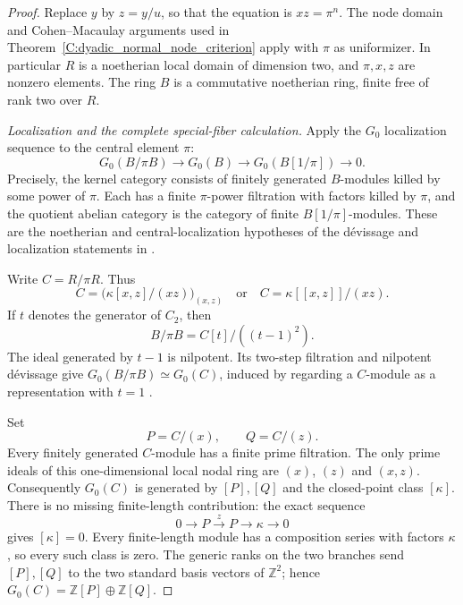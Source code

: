 \begin{proof}
Replace $y$ by $z=y/u$, so that the equation is
$xz=\pi^n$.  The node domain and Cohen--Macaulay
arguments used in Theorem~\ref{C:dyadic_normal_node_criterion}
apply with $\pi$ as uniformizer.
In particular $R$ is a noetherian local domain of
dimension two, and $\pi,x,z$ are nonzero elements.
The ring $B$ is a commutative noetherian ring, finite
free of rank two over $R$.

\emph{Localization and the complete special-fiber calculation.}
Apply the $G_0$ localization sequence to the central
element $\pi$:
\[
 G_0(B/\pi B)\longrightarrow G_0(B)
       \longrightarrow G_0(B[1/\pi])\longrightarrow0. \tag{C.1.MB2}
\]
Precisely, the kernel category consists of finitely
generated $B$-modules killed by some power of $\pi$.
Each has a finite $\pi$-power filtration with factors
killed by $\pi$, and the quotient abelian category
is the category of finite $B[1/\pi]$-modules.
These are the noetherian and central-localization
hypotheses of the d\'evissage and localization statements
in \cite[II.6.3, II.6.3.3 and II.6.4.1]
{C-WeibelKbook2013}.

Write $C=R/\pi R$.  Thus
\[
 C=\bigl(\kappa[x,z]/(xz)\bigr)_{(x,z)}
 \quad\text{or}\quad C=\kappa[[x,z]]/(xz).
\]
If $t$ denotes the generator of $C_2$, then
\[
 B/\pi B=C[t]/((t-1)^2).
\]
The ideal generated by $t-1$ is nilpotent.
Its two-step filtration and nilpotent d\'evissage give
$G_0(B/\pi B)\simeq G_0(C)$, induced by regarding
a $C$-module as a representation with $t=1$
\cite[II.6.3.1]{C-WeibelKbook2013}.

Set
\[
 P=C/(x),\qquad Q=C/(z).
\]
Every finitely generated $C$-module has a finite prime
filtration.  The only prime ideals of this one-dimensional
local nodal ring are $(x)$, $(z)$ and $(x,z)$.
Consequently $G_0(C)$ is generated by $[P],[Q]$ and
the closed-point class $[\kappa]$.
There is no missing finite-length contribution:
the exact sequence
\[
 0\longrightarrow P\xrightarrow{z}P
       \longrightarrow\kappa\longrightarrow0
\]
gives $[\kappa]=0$.
Every finite-length module has a composition series
with factors $\kappa$, so every such class is zero.
The generic ranks on the two branches send $[P],[Q]$
to the two standard basis vectors of $\mathbb Z^2$;
hence $G_0(C)=\mathbb Z[P]\oplus\mathbb Z[Q]$.


\end{proof}
